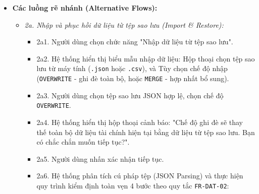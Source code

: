 \documentclass[11pt,a4paper]{article}
\providecommand{\tightlist}{
  \setlength{\itemsep}{0pt}\setlength{\parskip}{0pt}}
\begin{document}
\begin{itemize}
\begin{enumerate}
    \begin{itemize}
    \tightlist
    \item
      Chuẩn hóa toàn bộ các trường \texttt{BigDecimal} thành chuỗi số
      học chính xác (ví dụ: \texttt{"50000000.00"}), cấm tuyệt đối
      chuyển đổi sang kiểu \texttt{Double} hoặc ký hiệu số mũ khoa học
      (\texttt{5.0E7}) theo quy tắc \texttt{FR-DAT-01}.
    \item
      Định dạng các trường ngày tháng theo chuẩn ISO-8601
      (\texttt{yyyy-MM-dd}).
    \end{itemize}
  \item
    Hệ thống tạo tên tệp theo quy tắc:
    \texttt{pfms\_export\_full\_\{timestamp\}.json}.
  \item
    Hệ thống ghi tệp an toàn xuống đĩa cứng với bảng mã UTF-8.
  \item
    Hệ thống kiểm tra lại kích thước và tính toàn vẹn của tệp vừa tạo.
  \item
    Hệ thống hiển thị thông báo xuất dữ liệu thành công kèm đường dẫn
    tệp, kích thước tệp và tổng số lượng bản ghi đã xuất của từng phân
    hệ.
  \end{enumerate}
\item
  \textbf{Các luồng rẽ nhánh (Alternative Flows):}

  \begin{itemize}
  \tightlist
  \item
    \emph{2a. Nhập và phục hồi dữ liệu từ tệp sao lưu (Import \&
    Restore):}

    \begin{itemize}
    \tightlist
    \item
      2a1. Người dùng chọn chức năng "Nhập dữ liệu từ tệp sao lưu".
    \item
      2a2. Hệ thống hiển thị biểu mẫu nhập dữ liệu: Hộp thoại chọn tệp
      sao lưu từ máy tính (\texttt{.json} hoặc \texttt{.csv}), và Tùy
      chọn chế độ nhập (\texttt{OVERWRITE} - ghi đè toàn bộ, hoặc
      \texttt{MERGE} - hợp nhất bổ sung).
    \item
      2a3. Người dùng chọn tệp sao lưu JSON hợp lệ, chọn chế độ
      \texttt{OVERWRITE}.
    \item
      2a4. Hệ thống hiển thị hộp thoại cảnh báo: "Chế độ ghi đè sẽ thay
      thế toàn bộ dữ liệu tài chính hiện tại bằng dữ liệu từ tệp sao
      lưu. Bạn có chắc chắn muốn tiếp tục?".
    \item
      2a5. Người dùng nhấn xác nhận tiếp tục.
    \item
      2a6. Hệ thống phân tích cú pháp tệp (JSON Parsing) và thực hiện
      quy trình kiểm định toàn vẹn 4 bước theo quy tắc
      \texttt{FR-DAT-02}:


\end{itemize}
\end{itemize}
\end{itemize}
\end{document}
